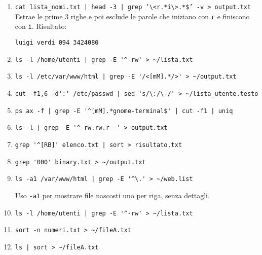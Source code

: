 \documentclass{report}
\begin{document}
\begin{enumerate}
\item 
\texttt{cat lista\_nomi.txt | head -3 | grep '\textbackslash<r.*i\textbackslash>.*\$' -v > output.txt} \\
Estrae le prime 3 righe e poi esclude le parole che iniziano con \texttt{r} e finiscono con \texttt{i}. Risultato:
\begin{verbatim}
luigi verdi 094 3424080
\end{verbatim}

\item 
\begin{verbatim}
ls -l /home/utenti | grep -E '^-rw' > ~/lista.txt
\end{verbatim}

\item 
\begin{verbatim}
ls -l /etc/var/www/html | grep -E '/<[mM].*/>' > ~/output.txt
\end{verbatim}

\item 
\begin{verbatim}
cut -f1,6 -d':' /etc/passwd | sed 's/\:/\-/' > ~/lista_utente.testo
\end{verbatim}

\item 
\begin{verbatim}
ps ax -f | grep -E '^[mM].*gnome-terminal$' | cut -f1 | uniq
\end{verbatim}

\item 
\begin{verbatim}
ls -l | grep -E '^-rw.rw.r--' > output.txt
\end{verbatim}

\item 
\begin{verbatim}
grep '^[RB]' elenco.txt | sort > risultato.txt
\end{verbatim}

\item 
\begin{verbatim}
grep '000' binary.txt > ~/output.txt
\end{verbatim}

\item 
\begin{verbatim}
ls -a1 /var/www/html | grep -E '^\.' > ~/web.list
\end{verbatim}
Uso \texttt{-a1} per mostrare file nascosti uno per riga, senza dettagli.

\item 
\begin{verbatim}
ls -l /home/utenti | grep -E '^-rw' > ~/lista.txt
\end{verbatim}

\item 
\begin{verbatim}
sort -n numeri.txt > ~/fileA.txt
\end{verbatim}

\item 
\begin{verbatim}
ls | sort > ~/fileA.txt
\end{verbatim}
\end{enumerate}
\newpage
\end{document}
